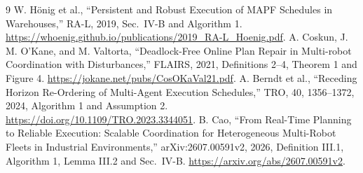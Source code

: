 \documentclass[11pt,a4paper]{article}
\begin{document}
\begin{thebibliography}{9}\small
{} W. H\"onig et al., ``Persistent and Robust Execution of MAPF
Schedules in Warehouses,'' RA-L, 2019, Sec.~IV-B and Algorithm 1.
\url{https://whoenig.github.io/publications/2019_RA-L_Hoenig.pdf}.
 A. Coskun, J. M. O'Kane, and M. Valtorta, ``Deadlock-Free Online
Plan Repair in Multi-robot Coordination with Disturbances,'' FLAIRS, 2021,
Definitions 2--4, Theorem 1 and Figure 4.
\url{https://jokane.net/pubs/CosOKaVal21.pdf}.
 A. Berndt et al., ``Receding Horizon Re-Ordering of Multi-Agent
Execution Schedules,'' TRO, 40, 1356--1372, 2024, Algorithm 1 and Assumption 2.
\url{https://doi.org/10.1109/TRO.2023.3344051}.
 B. Cao, ``From Real-Time Planning to Reliable Execution:
Scalable Coordination for Heterogeneous Multi-Robot Fleets in Industrial
Environments,'' arXiv:2607.00591v2, 2026, Definition III.1, Algorithm 1,
Lemma III.2 and Sec.~IV-B.
\url{https://arxiv.org/abs/2607.00591v2}.
\end{thebibliography}
\end{document}
